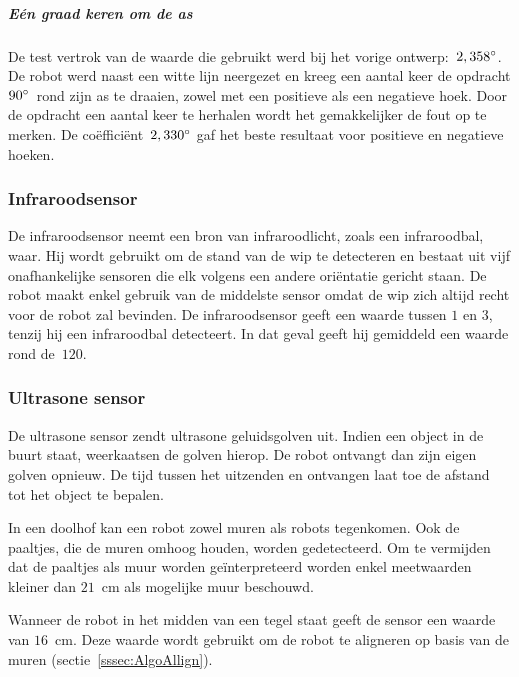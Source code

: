 \documentclass[eind]{penoverslag}
\begin{document}
\subparagraph{E\'en graad keren om de as}
De test vertrok van de waarde die gebruikt werd bij het vorige ontwerp:~$2,358\degree$. De robot werd naast een witte lijn neergezet en kreeg een aantal keer de opdracht $90\degree$~rond zijn as te draaien, zowel met een positieve als een negatieve hoek. Door de opdracht een aantal keer te herhalen wordt het gemakkelijker de fout op te merken.
De co\"effici\"ent~$2,330\degree$ gaf het beste resultaat voor positieve en negatieve hoeken.



\subsubsection{Infraroodsensor}
De infraroodsensor neemt een bron van infraroodlicht, zoals een infraroodbal, waar. Hij wordt gebruikt om de stand van de wip te detecteren en bestaat uit vijf onafhankelijke sensoren die elk volgens een andere ori\"entatie gericht staan. De robot maakt enkel gebruik van de middelste sensor omdat de wip zich altijd recht voor de robot zal bevinden. De infraroodsensor geeft een waarde tussen $1$ en $3$, tenzij hij een infraroodbal detecteert. In dat geval geeft hij gemiddeld een waarde rond de~$120$.

\subsubsection{Ultrasone sensor}
De ultrasone sensor zendt ultrasone geluidsgolven uit. Indien een object in de buurt staat, weerkaatsen de golven hierop. De robot ontvangt dan zijn eigen golven opnieuw. De tijd tussen het uitzenden en ontvangen laat toe de afstand tot het object te bepalen.

In een doolhof kan een robot zowel muren als robots tegenkomen. Ook de paaltjes, die de muren omhoog houden, worden gedetecteerd. Om te vermijden dat de paaltjes als muur worden ge\"interpreteerd worden enkel meetwaarden kleiner dan $21$~cm als mogelijke muur beschouwd.

Wanneer de robot in het midden van een tegel staat geeft de sensor een waarde van $16$~cm. Deze waarde wordt gebruikt om de robot te aligneren op basis van de muren (sectie~\ref{sssec:AlgoAllign}).

\end{document}
